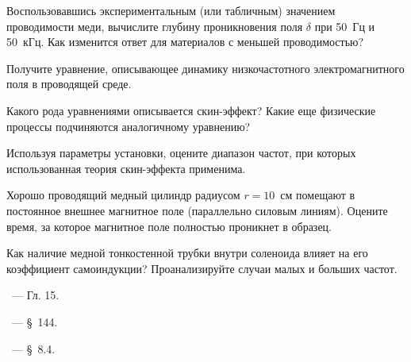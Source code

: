 \begin{lab:questions}
\item Воспользовавшись экспериментальным (или табличным) значением проводимости меди, 
вычислите глубину проникновения поля $\delta$ при 50~Гц и 50~кГц.
Как изменится ответ для материалов с меньшей проводимостью?

\item Получите уравнение, описывающее динамику низкочастотного электромагнитного 
поля в проводящей среде.

\item Какого рода уравнениями описывается скин-эффект? Какие еще физические
процессы подчиняются аналогичному уравнению?

\item Используя параметры установки, оцените диапазон частот, 
при которых использованная теория скин-эффекта применима.

\item Хорошо проводящий медный цилиндр радиусом $r=10$~см помещают в постоянное внешнее магнитное поле
(параллельно силовым линиям). Оцените время, за которое магнитное поле полностью проникнет в образец.

\item Как наличие медной тонкостенной трубки внутри соленоида влияет 
на его коэффициент самоиндукции?
Проанализируйте случаи малых и больших частот.

%

%
%

\end{lab:questions}


\begin{lab:literature}
\item \Kirichenko~--- Гл. 15.

\item \SivuhinIII~--- \S~144.

\item \KingLokOlh~--- \S~8.4.
\end{lab:literature}

